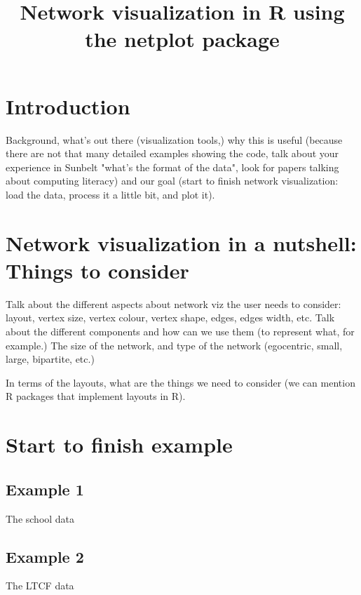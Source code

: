 \documentclass[jou,floatsintext]{apa7}
\title{Network visualization in R using the netplot package}
\begin{document}
\maketitle

\section{Introduction}

Background, what's out there (visualization tools,) why this is useful (because there are not that many detailed examples showing the code, talk about your experience in Sunbelt "what's the format of the data", look for papers talking about computing literacy) and our goal (start to finish network visualization: load the data, process it a little bit, and plot it).

\section{Network visualization in a nutshell: Things to consider}

Talk about the different aspects about network viz the user needs to consider: layout, vertex size, vertex colour, vertex shape, edges, edges width, etc. Talk about the different components and how can we use them (to represent what, for example.) The size of the network, and type of the network (egocentric, small, large, bipartite, etc.)

In terms of the layouts, what are the things we need to consider (we can mention R packages that implement layouts in R).

\section{Start to finish example}


\subsection{Example 1}

The school data

\subsection{Example 2}

The LTCF data

\printbibliography

\appendix
\end{document}
